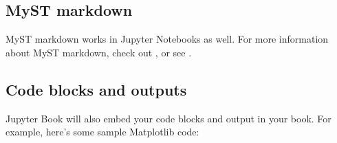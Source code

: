 \documentclass[letterpaper,10pt,english]{sphinxmanual}
\begin{document}
\subsection{MyST markdown}
\label{\detokenize{notebooks:myst-markdown}}
MyST markdown works in Jupyter Notebooks as well. For more information about MyST markdown, check
out ,
or see .


\subsection{Code blocks and outputs}
\label{\detokenize{notebooks:code-blocks-and-outputs}}
Jupyter Book will also embed your code blocks and output in your book.
For example, here’s some sample Matplotlib code:

\begin{sphinxVerbatim}[commandchars=\\\{\}]
    
   
   
\end{sphinxVerbatim}
\end{document}
